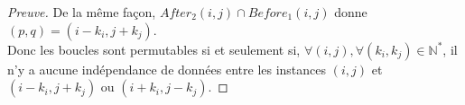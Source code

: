 \documentclass{article}
\begin{document}
\begin{proof}[Preuve]
De la même façon, $After_{2}(i,j) \cap Before_{1}(i,j)$ donne $(p,q) = (i-k_i, j+k_j)$.\\

Donc les boucles sont permutables si et seulement si, $\forall (i,j), \forall (k_i, k_j) \in \mathbb{N}^*$, il n'y a aucune  indépendance de données entre les instances $(i,j)$ et $(i-k_i, j+k_j)$ ou $(i+k_i, j-k_j)$.

\end{proof}
\end{document}
